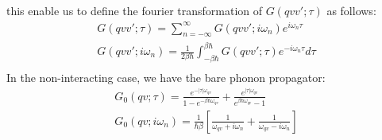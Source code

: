 \documentclass{article}
\begin{document}
this enable us to define the fourier transformation of $G(qvv';\tau )$ as follows:
\begin{align}
    G(qvv';\tau) = \sum_{n = - \infty}^{\infty} G(qvv';i\omega_n) e^{i\omega_n\tau} \\
    G(qvv';i\omega_n) = \frac{1}{2\beta\hbar} \int_{-\beta\hbar}^{\beta\hbar} G(qvv';\tau) e^{-i\omega_n\tau} d\tau \\
\end{align} 
In the non-interacting case, we have the bare phonon propagator:
\begin{align}
    G_0(qv;\tau) = \frac{e^{-|\tau|\omega_{qv}}}{1-e^{-\beta\hbar\omega_{qv}}} + \frac{e^{|\tau|\omega_{qv}}}{e^{\beta\hbar\omega_{qv}}-1} \\
    G_0(qv;i\omega_n) = \frac{1}{\hbar\beta}\left[ \frac{1}{\omega_{qv}+i\omega_n} + \frac{1}{\omega_{qv}-i\omega_n} \right]
\end{align}
\end{document}
